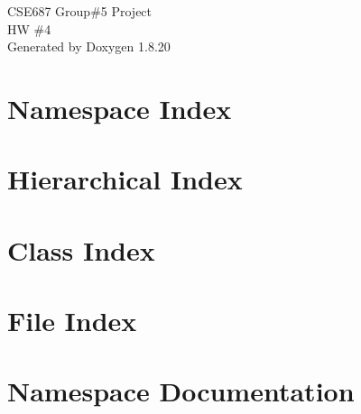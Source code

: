 \let\mypdfximage\pdfximage\def\pdfximage{\immediate\mypdfximage}\documentclass[twoside]{book}
\newcommand{\+}{\discretionary{\mbox{\scriptsize$\hookleftarrow$}}{}{}}
\newcommand{\clearemptydoublepage}{%
  \newpage{\pagestyle{empty}\cleardoublepage}%
}
\begin{document}
\hypersetup{pageanchor=false,
             bookmarksnumbered=true,
             pdfencoding=unicode
            }
\begin{titlepage}
\vspace*{7cm}
\begin{center}%
{\Large C\+S\+E687 Group\#5 Project \\[1ex]\large HW \#4 }\\
\vspace*{1cm}
{\large Generated by Doxygen 1.8.20}\\
\end{center}
\end{titlepage}
\clearemptydoublepage
{}
\tableofcontents
\clearemptydoublepage
{}
\hypersetup{pageanchor=true}

\chapter{Namespace Index}

\chapter{Hierarchical Index}

\chapter{Class Index}

\chapter{File Index}

\chapter{Namespace Documentation}






\end{document}
